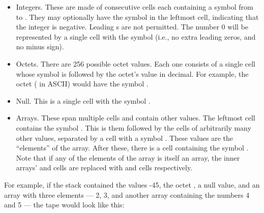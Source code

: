\begin{itemize}
    \item Integers. These are made of consecutive cells each containing a symbol from  to . They may optionally have the symbol \symb{-} in the leftmost cell, indicating that the integer is negative. Leading s are not permitted. The number 0 will be represented by a single cell with the symbol  (i.e., no extra leading zeros, and no minus sign).
    \item Octets. There are 256 possible octet values. Each one consists of a single cell whose symbol is  followed by the octet's value in decimal. For example, the octet  ( in ASCII) would have the symbol .
    \item Null. This is a single cell with the symbol .
    \item Arrays. These span multiple cells and contain other values. The leftmost cell contains the symbol \symb{(}. This is them followed by the cells of arbitrarily many other values, separated by a cell with a symbol \symb{;}. These values are the ``elements'' of the array. After these, there is a cell containing the symbol \symb{)}. Note that if any of the elements of the array is itself an array, the inner arrays' \symb{(} and \symb{)} cells are replaced with \symb{[} and \symb{]} cells respectively.
\end{itemize}

For example, if the stack contained the values -45, the octet , a null value, and an array with three elements --- 2, 3, and another array containing the numbers 4 and 5 --- the tape would look like this:

